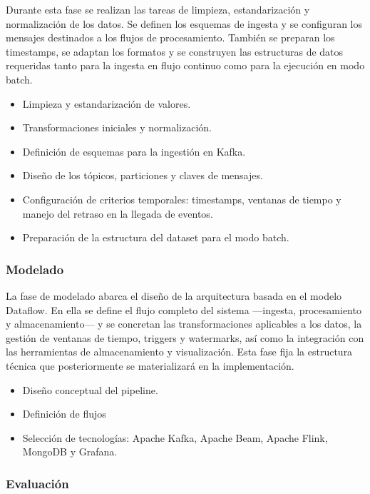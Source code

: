 \documentclass[12pt,a4paper]{article}
\providecommand{\tightlist}{%
  \setlength{\itemsep}{0pt}\setlength{\parskip}{0pt}}
\begin{document}
Durante esta fase se realizan las tareas de limpieza, estandarización y normalización de los datos. Se definen los esquemas de ingesta y se configuran los mensajes destinados a los flujos de procesamiento. También se preparan los timestamps, se adaptan los formatos y se construyen las estructuras de datos requeridas tanto para la ingesta en flujo continuo como para la ejecución en modo batch.

\begin{itemize}
    \tightlist
    \item
          Limpieza y estandarización de valores.
    \item
          Transformaciones iniciales y normalización.
    \item
          Definición de esquemas para la ingestión en Kafka.
    \item
          Diseño de los tópicos, particiones y claves de mensajes.
    \item
          Configuración de criterios temporales: timestamps, ventanas de tiempo y manejo del retraso en la llegada de eventos.
    \item
          Preparación de la estructura del dataset para el modo batch.
\end{itemize}

\subsubsection{\texorpdfstring{Modelado}{Modelado}}\label{modelado}

La fase de modelado abarca el diseño de la arquitectura basada en el modelo Dataflow. En ella se define el flujo completo del sistema ---ingesta, procesamiento y almacenamiento--- y se concretan las transformaciones aplicables a los datos, la gestión de ventanas de tiempo, triggers y watermarks, así como la integración con las herramientas de almacenamiento y visualización. Esta fase fija la estructura técnica que posteriormente se materializará en la implementación.

\begin{itemize}
    \tightlist
    \item
          Diseño conceptual del pipeline.
    \item
          Definición de flujos
    \item
          Selección de tecnologías: Apache Kafka, Apache Beam, Apache Flink, MongoDB y Grafana.
\end{itemize}

\subsubsection{\texorpdfstring{Evaluación}{Evaluación}}\label{evaluaciuxf3n}
\end{document}
